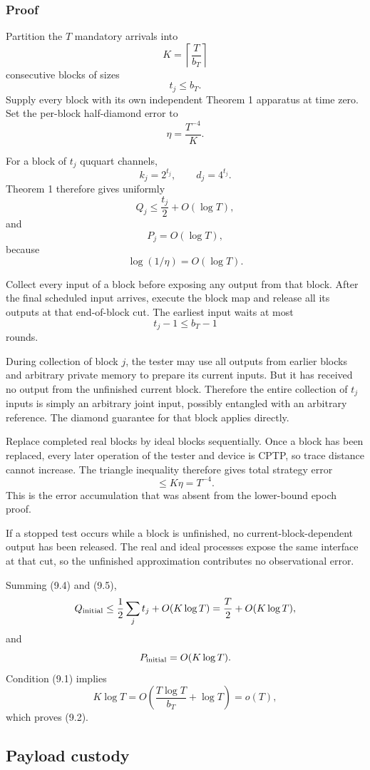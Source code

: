 \documentclass[11pt,a4paper]{article}
\numberwithin{equation}{section}
\begin{document}
\subsubsection{Proof}\label{proof-6}

Partition the \(T\) mandatory arrivals into \[
K=\left\lceil\frac{T}{b_T}\right\rceil
\] consecutive blocks of sizes \[
t_j\le b_T.
\] Supply every block with its own independent Theorem 1 apparatus at
time zero. Set the per-block half-diamond error to \[
\eta=\frac{T^{-4}}K.
\tag{9.3}
\]

For a block of \(t_j\) ququart channels, \[
k_j=2^{t_j},\qquad d_j=4^{t_j}.
\] Theorem 1 therefore gives uniformly \[
Q_j
\le
\frac{t_j}{2}+O(\log T),
\tag{9.4}
\] and \[
P_j=O(\log T),
\tag{9.5}
\] because \[
\log(1/\eta)=O(\log T).
\]

Collect every input of a block before exposing any output from that
block. After the final scheduled input arrives, execute the block map
and release all its outputs at that end-of-block cut. The earliest input
waits at most \[
t_j-1\le b_T-1
\] rounds.

During collection of block \(j\), the tester may use all outputs from
earlier blocks and arbitrary private memory to prepare its current
inputs. But it has received no output from the unfinished current block.
Therefore the entire collection of \(t_j\) inputs is simply an arbitrary
joint input, possibly entangled with an arbitrary reference. The diamond
guarantee for that block applies directly.

Replace completed real blocks by ideal blocks sequentially. Once a block
has been replaced, every later operation of the tester and device is
CPTP, so trace distance cannot increase. The triangle inequality
therefore gives total strategy error \[
\le K\eta=T^{-4}.
\tag{9.6}
\] This is the error accumulation that was absent from the lower-bound
epoch proof.

If a stopped test occurs while a block is unfinished, no
current-block-dependent output has been released. The real and ideal
processes expose the same interface at that cut, so the unfinished
approximation contributes no observational error.

Summing (9.4) and (9.5), \[
Q_{\rm initial}
\le
\frac12\sum_jt_j+O(K\log T)
=
\frac T2+O(K\log T),
\] and \[
P_{\rm initial}=O(K\log T).
\] Condition (9.1) implies \[
K\log T
=
O\!\left(\frac{T\log T}{b_T}+\log T\right)
=o(T),
\] which proves (9.2).

\subsection*{Payload custody}\label{payload-custody}
\end{document}
